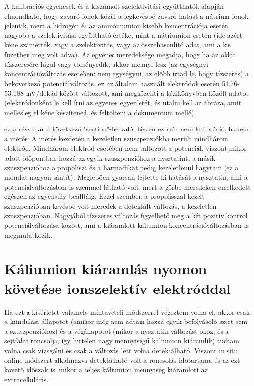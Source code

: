 A kalibrációs egyenesek és a kiszámolt szelektivitási együtthatók alapján elmondható, hogy zavaró ionok közül a legkevésbé zavaró hatást a nátrium ionok jelentik, mert a hidrogén és az ammóniumion kisebb koncentrációja esetén nagyobb a szelektivitási együttható értéke, mint a nátriumion esetén (ide azért kéne számérték. vagy a szelektivitás, vagy az összehasonlító adat, ami a kis füzetben meg volt adva).  Az egyenes meredeksége megadja, hogy ha az oldat tízszeresére hígul vagy töményedik, akkor mennyi lesz (az egységnyi koncentrációváltozás esetében: nem egységyni, az előbb írtad le, hogy tízszeres) a bekövetkező potenciálváltozás, ez az általam használt elektródok esetén 54.76-53.188 mV/dekád között változott, ami megközelíti a kézikönyvben közölt adatot (elektródonként le kell írni az egyenes egyenletét, és utalni kell az ábrára, amit mellesleg el kéne készítened, és feltölteni a dokumentum mellé).

ez a rész már a következő "section"-be való, hiszen ez már nem kalibráció, hanem a mérés:
 A mérés kezdetén a kezeletlen szuszpenziókba merült mindhárom elektród. Mindhárom elektród esetében nem változott a potenciál, viszont mikor adott időpontban hozzá az egyik szuszpenzióhoz a nysztatint, a másik szuszpenzióhoz a propoliszt és a harmadikat pedig kezeletlenül hagytam (ez a mondat nagyon sántít). Meglepően gyorsan fejtette ki hatását a nysztatin, ami a potenciálváltozásban is szemmel látható volt, mert a görbe meredeken emelkedett egészen az egyensúly beálltáig. Ezzel szemben a propolisszal kezelt szuszpenzióban kevésbé volt meredek a detektált változás, a kezeletlen szuszpenzióban. Nagyjából tízszeres változás figyelhető meg a két pozitív kontrol potenciálváltozása között, ami a kiáramlott káliumion-koncentrációváltozásban is megmutatkozik. 

\section{Káliumion kiáramlás nyomon követése ionszelektív elektróddal}
Ha ezt a kísérletet valamely mintavételi módszerrel végeztem volna el, akkor csak a kiindulási állapotot (amikor még nem adtam hozzá egyik befolyásoló szert sem a szuszpenzióhoz) és a végállapotot (mikor a nysztatin változást okoz, és a sejtfalat roncsolja, így hirtelen nagy mennyiségű káliumion kiáramlik) tudtam volna csak vizsgálni és csak a változás lett volna detektálható. Viszont in situ online módszert alkalmazva detektálható volt a roncsolás időtartama és az ezt követő időszak is, mikor a teljes káliumion mennyiség kiáramlott az extracelluláris. 

